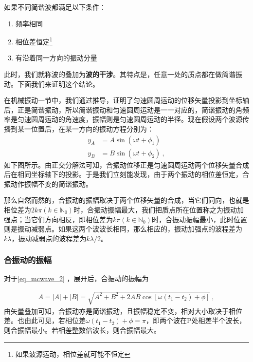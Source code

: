 如果不同简谐波都满足以下条件：
\begin{enumerate}
\item 频率相同
\item 相位差恒定\footnote{如果波源运动，相位差就可能不恒定}
\item 有沿着同一方向的振动分量
\end{enumerate}
此时，我们就称波的叠加为\textbf{波的干涉}。其特点是，任意一处的质点都在做简谐振动。下面我们来证明这个结论。



在机械振动一节中，我们通过推导，证明了匀速圆周运动的位移矢量投影到坐标轴后，正是简谐振动，所以简谐振动和匀速圆周运动是一一对应的，简谐振动的角频率是匀速圆周运动的角速度，振幅则是匀速圆周运动的半径。现在假设两个波源传播到某一位置后，在某一方向的振动方程分别为：
\begin{equation}\label{eq_mcwave_2}
\begin{aligned}
y_A&=A\sin(\omega t+\phi_1)\\
y_B&=B\sin (\omega t+\phi_2)~,
\end{aligned}
\end{equation}
如下图所示。由正交分解法可知，合振动位移正是匀速圆周运动两个位移矢量合成后在相同坐标轴下的投影。于是我们立刻能发现，由于两个振动的相位差恒定，合振动作振幅不变的简谐振动。

那么自然而然的，合振动的振幅取决于两个位移矢量的合成，当它们同向，也就是相位差为$2k\pi(k\in \mathbb{N}_0)$时，合振动振幅最大，我们把质点所在位置称之为振动加强点；当它们方向相反，即相位差为$k\pi(k\in \mathbb{N}_0)$时，合振动振幅最小，此时位置则是振动减弱点。如果这两个波波长相同，那么相应的，振动加强点的波程差为$k\lambda $，振动减弱点的波程差为$k\lambda/2$。
\subsubsection{合振动的振幅}
对于\autoref{eq_mcwave_2} ，展开后，合振动的振幅为

\begin{equation}
\begin{aligned}
A=|A|+|B|=\sqrt{A^2+B^2+2AB\cos[\omega(t_1-t_2)+\phi]}~,
\end{aligned}
\end{equation}
由矢量叠加可知，合振动亦是简谐振动，且振幅稳定不变，相对大小取决于相位差。也由此可见，若相位差$\omega(t_1-t_2)+\phi=\pi$，即两个波在P处相差半个波长，则合振幅最小。若相差整数倍波长，则合振幅最大。